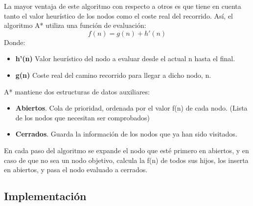 \documentclass[a4paper,12pt,oneside]{book}
\begin{document}
La mayor ventaja de este algoritmo con respecto a otros es que tiene
en cuenta tanto el valor heurístico de los nodos como el coste real del
recorrido. Así, el algoritmo A* utiliza una función de evaluación:
$$f(n) = g(n) + h'(n) $$
Donde:
\begin {itemize}
\item {\bf h'(n)} Valor heurístico del nodo a evaluar desde el actual n
  hasta el final.
\item {\bf g(n)} Coste real del camino recorrido para llegar a dicho nodo, n.
\end {itemize}


A* mantiene dos estructuras de datos auxiliares:
\begin {itemize}
\item {\bf Abiertos}. Cola de prioridad, ordenada por el valor f(n) de
  cada nodo. (Lista de los nodos que necesitan ser comprobados)
\item {\bf Cerrados}. Guarda la información de los nodos que ya han
  sido visitados.
\end {itemize}
En cada paso del algoritmo se expande el nodo que esté primero en
abiertos, y en caso de que no sea un nodo objetivo, calcula la f(n) de
todos sus hijos, los inserta en abiertos, y pasa el nodo evaluado a cerrados.



\subsection {Implementación}
\end{document}
